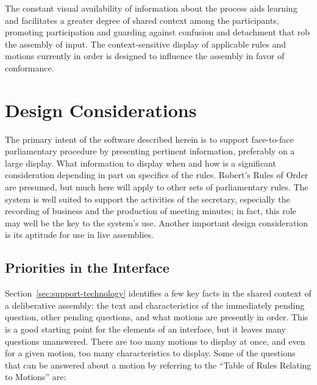 \documentclass{acm_proc_article-sp}
\begin{document}

The constant visual availability of information about the process aids learning and facilitates a greater degree of shared context among the participants, promoting participation and guarding against confusion and detachment that rob the assembly of input. The context-sensitive display of applicable rules and motions currently in order is designed to influence the assembly in favor of conformance.


\section{Design Considerations}  %

The primary intent of the software described herein is to support face-to-face parliamentary procedure by presenting pertinent information, preferably on a large display. What information to display when and how is a significant consideration depending in part on specifics of the rules. Robert's Rules of Order are presumed, but much here will apply to other sets of parliamentary rules. The system is well suited to support the activities of the secretary, especially the recording of business and the production of meeting minutes; in fact, this role may well be the key to the system's use. Another important design consideration is its aptitude for use in live assemblies.

\subsection{Priorities in the Interface}


Section~\ref{sec:support-technology} identifies a few key facts in the shared context of a deliberative assembly: the text and characteristics of the immediately pending question, other pending questions, and what motions are presently in order. This is a good starting point for the elements of an interface, but it leaves many questions unanswered. There are too many motions to display at once, and even for a given motion, too many characteristics to display. Some of the questions that can be answered about a motion by referring to the ``Table of Rules Relating to Motions'' are:
\end{document}

